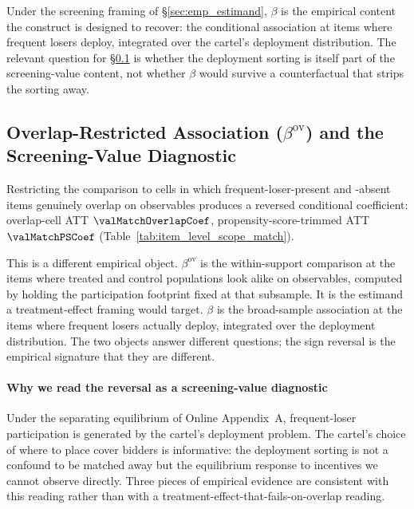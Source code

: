 Under the screening framing of §\ref{sec:emp_estimand}, $\beta$
is the empirical content the construct is designed to recover:
the conditional association at items where frequent losers
deploy, integrated over the cartel's deployment distribution.
The relevant question for §\ref{sec:results_overlap} is whether
the deployment sorting is itself part of the screening-value
content, not whether $\beta$ would survive a counterfactual
that strips the sorting away.

\subsection{Overlap-Restricted Association \texorpdfstring{($\beta^{\text{ov}}$)}{(beta-ov)} and the
Screening-Value Diagnostic}
\label{sec:results_overlap}

Restricting the comparison to cells in which frequent-loser-present
and -absent items genuinely overlap on observables produces a
reversed conditional coefficient: overlap-cell ATT
$\valMatchOverlapCoef$, propensity-score-trimmed ATT
$\valMatchPSCoef$
(Table~\ref{tab:item_level_scope_match}).



This is a different empirical object. $\beta^{\text{ov}}$ is the
within-support comparison at the items where treated and control
populations look alike on observables, computed by holding the
participation footprint fixed at that subsample. It is the
estimand a treatment-effect framing would target.
$\beta$ is the broad-sample association at the items where
frequent losers actually deploy, integrated over the deployment
distribution. The two objects answer different questions; the
sign reversal is the empirical signature that they are
different.

\paragraph{Why we read the reversal as a screening-value
diagnostic} Under the separating equilibrium of
Online Appendix~A, frequent-loser participation is generated by
the cartel's deployment problem. The cartel's choice of where
to place cover bidders is informative: the deployment sorting is
not a confound to be matched away but the equilibrium response
to incentives we cannot observe directly. Three pieces of
empirical evidence are consistent with this reading rather than
with a treatment-effect-that-fails-on-overlap reading.

